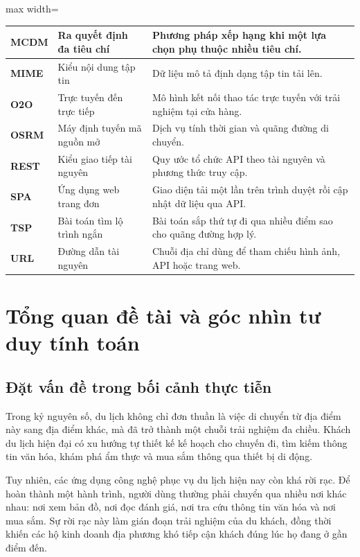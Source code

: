 \documentclass[12pt, a4paper]{article}
\begin{document}
\begin{table}[H]
\begin{adjustbox}{max width=\textwidth}
\begin{tabular}{|p{2.0cm}|p{5.5cm}|p{6.5cm}|}
\textbf{MCDM} & Ra quyết định đa tiêu chí & Phương pháp xếp hạng khi một lựa chọn phụ thuộc nhiều tiêu chí. \\ \hline
\textbf{MIME} & Kiểu nội dung tập tin & Dữ liệu mô tả định dạng tập tin tải lên. \\ \hline
\textbf{O2O} & Trực tuyến đến trực tiếp & Mô hình kết nối thao tác trực tuyến với trải nghiệm tại cửa hàng. \\ \hline
\textbf{OSRM} & Máy định tuyến mã nguồn mở & Dịch vụ tính thời gian và quãng đường di chuyển. \\ \hline
\textbf{REST} & Kiểu giao tiếp tài nguyên & Quy ước tổ chức API theo tài nguyên và phương thức truy cập. \\ \hline
\textbf{SPA} & Ứng dụng web trang đơn & Giao diện tải một lần trên trình duyệt rồi cập nhật dữ liệu qua API. \\ \hline
\textbf{TSP} & Bài toán tìm lộ trình ngắn & Bài toán sắp thứ tự đi qua nhiều điểm sao cho quãng đường hợp lý. \\ \hline
\textbf{URL} & Đường dẫn tài nguyên & Chuỗi địa chỉ dùng để tham chiếu hình ảnh, API hoặc trang web. \\ \hline
\end{tabular}
\end{adjustbox}
\end{table}
\clearpage

\section{Tổng quan đề tài và góc nhìn tư duy tính toán}

\subsection{Đặt vấn đề trong bối cảnh thực tiễn}
Trong kỷ nguyên số, du lịch không chỉ đơn thuần là việc di chuyển từ địa điểm này sang địa điểm khác, mà đã trở thành một chuỗi trải nghiệm đa chiều. Khách du lịch hiện đại có xu hướng tự thiết kế kế hoạch cho chuyến đi, tìm kiếm thông tin văn hóa, khám phá ẩm thực và mua sắm thông qua thiết bị di động. 

Tuy nhiên, các ứng dụng công nghệ phục vụ du lịch hiện nay còn khá rời rạc. Để hoàn thành một hành trình, người dùng thường phải chuyển qua nhiều nơi khác nhau: nơi xem bản đồ, nơi đọc đánh giá, nơi tra cứu thông tin văn hóa và nơi mua sắm. Sự rời rạc này làm gián đoạn trải nghiệm của du khách, đồng thời khiến các hộ kinh doanh địa phương khó tiếp cận khách đúng lúc họ đang ở gần điểm đến.
\end{document}
